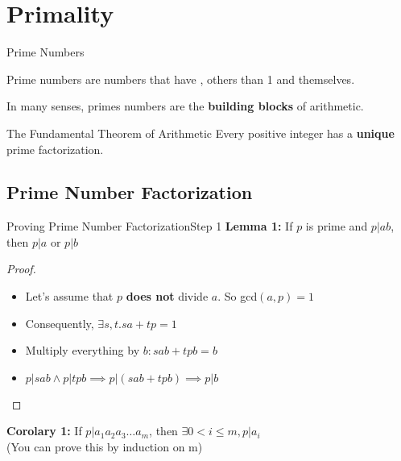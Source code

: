 \section{Primality}



\begin{frame}{Prime Numbers}

  Prime numbers are numbers that have , others than 1 and themselves.\bigskip

  In many senses, primes numbers are the {\bf building blocks} of arithmetic.\bigskip

  \begin{block}{The Fundamental Theorem of Arithmetic}
    Every positive integer has a {\bf unique} prime factorization.
  \end{block}
\end{frame}

\subsection{Prime Number Factorization}


\begin{frame}{Proving Prime Number Factorization}{Step 1}
    {\bf Lemma 1:} If $p$ is prime and $p|ab$, then $p|a$ or $p|b$

    \begin{proof}
      \begin{itemize}
        \item Let's assume that $p$ {\bf does not} divide $a$. So gcd$(a,p) = 1$
        \item Consequently, $\exists s,t. sa+tp = 1$
        \item Multiply everything by $b: sab+tpb = b$
        \item $p|sab \land p|tpb \implies p|(sab+tpb) \implies p|b$
      \end{itemize}
    \end{proof}

    {\bf Corolary 1:} If $p|a_1a_2a_3\ldots a_m$, then $\exists 0 < i \leq m, p|a_i$\\
    \hfill (You can prove this by induction on m)
\end{frame}



